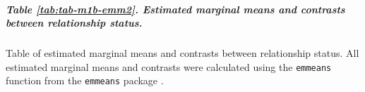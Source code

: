 \documentclass[
  bookmarksnumbered]{article}
\begin{document}
\begin{table}[H]
\centering
\caption{\label{tab:tab-m1b-emm1}Estimated marginal means and contrasts between participants' gender}
\centering
{}
\end{table}

\subparagraph{Table \ref{tab:tab-m1b-emm2}. Estimated marginal means and contrasts between relationship status.}\label{table-reftabtab-m1b-emm2.-estimated-marginal-means-and-contrasts-between-relationship-status.}

Table of estimated marginal means and contrasts between relationship status. All estimated marginal means and contrasts were calculated using the \texttt{emmeans} function from the \texttt{emmeans} package \autocite{emmeanscit}.
\end{document}

